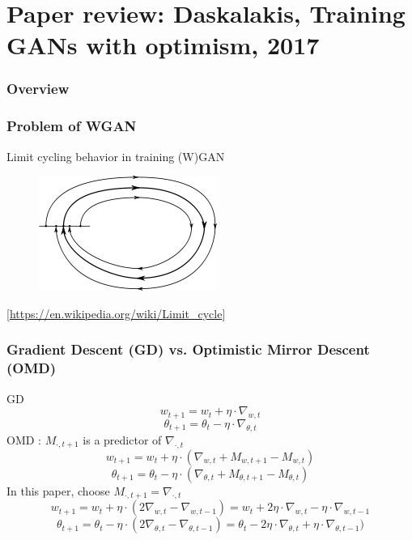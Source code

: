\documentclass{beamer}
\begin{document}
\section{Paper review: Daskalakis, Training GANs with optimism, 2017}

\begin{frame}
  \frametitle{Overview}
  \tableofcontents[currentsection]
\end{frame}

\begin{frame}
\frametitle{Problem of WGAN}
Limit cycling behavior in training (W)GAN
\begin{figure}
  \includegraphics[height=.3\textheight]{limit_cycle.png}
\end{figure}
[\url{https://en.wikipedia.org/wiki/Limit_cycle}]
\end{frame}

\begin{frame}
\frametitle{\small{Gradient Descent (GD) vs. Optimistic Mirror Descent (OMD)}}
GD
$$w_{t+1} = w_t + \eta \cdot \nabla_{w,t}$$
$$\theta_{t+1} = \theta_t - \eta \cdot \nabla_{\theta,t}$$
OMD \cite{Rakhlin2013}: $M_{\cdot,t+1}$ is a predictor of $\nabla_{\cdot,t}$
$$w_{t+1} = w_t + \eta \cdot (\nabla_{w,t} + M_{w,t+1} - M_{w,t})$$
$$\theta_{t+1} = \theta_t - \eta \cdot (\nabla_{\theta,t} + M_{\theta,t+1} - M_{\theta,t})$$
In this paper, choose $M_{\cdot,t+1} = \nabla_{\cdot, t}$
$$w_{t+1} = w_t + \eta \cdot (2\nabla_{w,t} - \nabla_{w,t-1}) = w_t + 2\eta \cdot \nabla_{w,t} - \eta \cdot \nabla_{w,t-1}$$
$$\theta_{t+1} = \theta_t - \eta \cdot (2\nabla_{\theta,t} - \nabla_{\theta,t-1}) = \theta_t - 2\eta \cdot \nabla_{\theta,t} + \eta \cdot \nabla_{\theta,t-1})$$
\end{frame}
\end{document}
